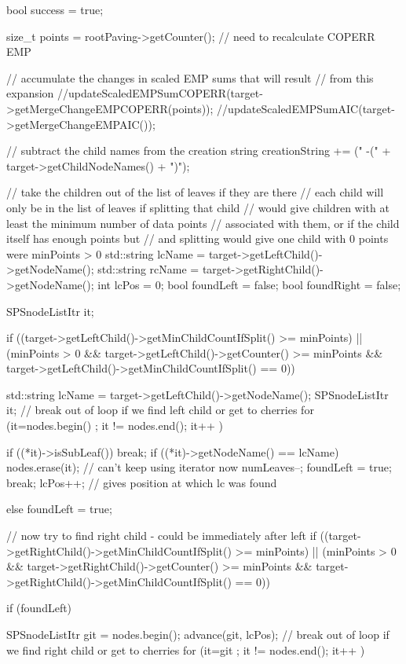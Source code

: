 \begin{DoxyCode}
{
    bool success = true;

    size_t points = rootPaving->getCounter(); // need to recalculate COPERR EMP

    // accumulate the changes in scaled EMP sums that will result
    // from this expansion
    //updateScaledEMPSumCOPERR(target->getMergeChangeEMPCOPERR(points));
    //updateScaledEMPSumAIC(target->getMergeChangeEMPAIC());

    // subtract the child names from the creation string
    creationString += (" -(" + target->getChildNodeNames() + ")");

    // take the children out of the list of leaves if they are there
    // each child will only be in the list of leaves if splitting that child
    // would give children with at least the minimum number of data points
    // associated with them, or if the child itself has enough points but
    // and splitting would give one child with 0 points were minPoints > 0
    std::string lcName = target->getLeftChild()->getNodeName();
    std::string rcName = target->getRightChild()->getNodeName();
    int lcPos = 0;
    bool foundLeft = false;
    bool foundRight = false;

    SPSnodeListItr it;

    if ((target->getLeftChild()->getMinChildCountIfSplit() >= minPoints)
        || (minPoints > 0 && target->getLeftChild()->getCounter() >= minPoints
            && target->getLeftChild()->getMinChildCountIfSplit() == 0)) {
        std::string lcName = target->getLeftChild()->getNodeName();
        SPSnodeListItr it;
        // break out of loop if we find left child or get to cherries
        for (it=nodes.begin() ; it != nodes.end(); it++ ) {

            if ((*it)->isSubLeaf()) break;
            if ((*it)->getNodeName() == lcName) {
                nodes.erase(it); // can't keep using iterator now
                numLeaves--;
                foundLeft = true;
                break;
            }
            lcPos++;  // gives position at which lc was found
        }
    }
    else foundLeft = true;

    // now try to find right child - could be immediately after left
    if ((target->getRightChild()->getMinChildCountIfSplit() >= minPoints)
        || (minPoints > 0 && target->getRightChild()->getCounter() >= minPoints
            && target->getRightChild()->getMinChildCountIfSplit() == 0)) {

        if (foundLeft) {
            SPSnodeListItr git = nodes.begin();
            advance(git, lcPos);
            // break out of loop if we find right child or get to cherries
            for (it=git ; it != nodes.end(); it++ ) {

}}}}
\end{DoxyCode}
